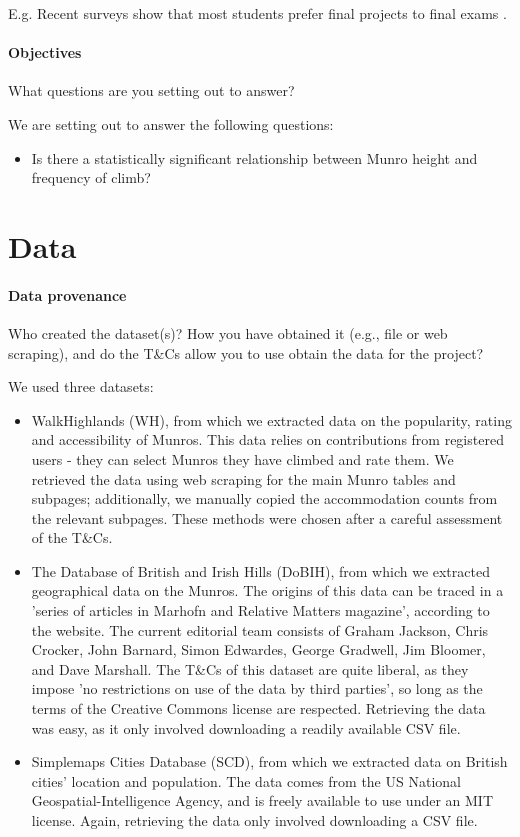 \documentclass[11pt,a4paper]{article}
\begin{document}
E.g. Recent surveys show that most students prefer final projects to
final exams \cite{Space2021}. 

\paragraph{Objectives}

What questions are you setting out to answer?

\medskip
We are setting out to answer the following questions:

\begin{itemize}
    \item Is there a statistically significant relationship between Munro height and frequency of climb?
\end{itemize}

\section{Data}

\paragraph{Data provenance} Who created the dataset(s)?  How you have
obtained it (e.g., file or web scraping), and do the T\&Cs allow you
to use obtain the data for the project?

\medskip
We used three datasets: 
\begin{itemize}
    \item WalkHighlands (WH), from which we extracted data on the popularity, rating and accessibility of Munros. This data relies on contributions from registered users - they can select Munros they have climbed and rate them. We retrieved the data using web scraping for the main Munro tables and subpages; additionally, we manually copied the accommodation counts from the relevant subpages. These methods were chosen after a careful assessment of the T\&Cs.
    \item The Database of British and Irish Hills (DoBIH), from which we extracted geographical data on the Munros. The origins of this data can be traced in a 'series of articles in Marhofn and Relative Matters magazine', according to the website. The current editorial team consists of Graham Jackson, Chris Crocker, John Barnard, Simon Edwardes, George Gradwell, Jim Bloomer, and Dave Marshall. The T\&Cs of this dataset are quite liberal, as they impose 'no restrictions on use of the data by third parties', so long as the terms of the Creative Commons license are respected. Retrieving the data was easy, as it only involved downloading a readily available CSV file.
    \item Simplemaps Cities Database (SCD), from which we extracted data on British cities' location and population. The data comes from the US National Geospatial-Intelligence Agency, and is freely available to use under an MIT license. Again, retrieving the data only involved downloading a CSV file.
\end{itemize}
\end{document}
